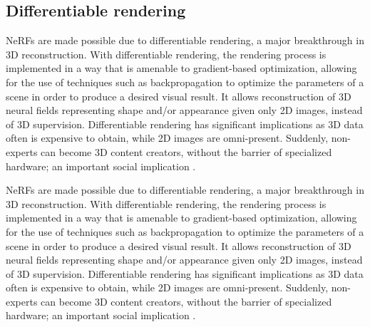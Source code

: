 
\subsection{Differentiable rendering} 
NeRFs are made possible due to differentiable rendering, a major breakthrough in 3D reconstruction. With differentiable rendering, the rendering process is implemented in a way that is amenable to gradient-based optimization, allowing for the use of techniques such as backpropagation to optimize the parameters of a scene in order to produce a desired visual result. It allows reconstruction of 3D neural fields representing shape and/or appearance given only 2D images, instead of 3D supervision. Differentiable rendering has significant implications as 3D data often is expensive to obtain, while 2D images are omni-present. Suddenly, non-experts can become 3D content creators, without the barrier of specialized hardware; an important social implication \cite{xie_neural_2022}.



NeRFs are made possible due to differentiable rendering, a major breakthrough in 3D reconstruction. With differentiable rendering, the rendering process is implemented in a way that is amenable to gradient-based optimization, allowing for the use of techniques such as backpropagation to optimize the parameters of a scene in order to produce a desired visual result. It allows reconstruction of 3D neural fields representing shape and/or appearance given only 2D images, instead of 3D supervision. Differentiable rendering has significant implications as 3D data often is expensive to obtain, while 2D images are omni-present. Suddenly, non-experts can become 3D content creators, without the barrier of specialized hardware; an important social implication \cite{xie_neural_2022}.

